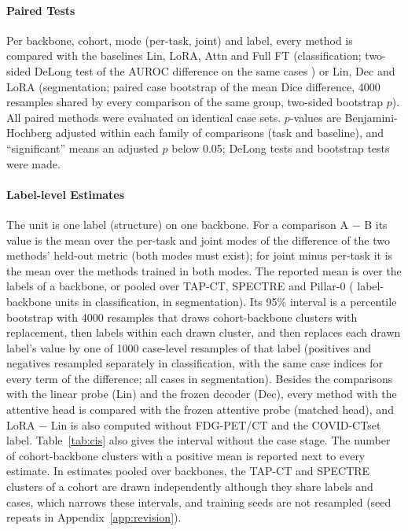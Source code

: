 \paragraph{Paired Tests} Per backbone, cohort, mode (per-task, joint) and label, every method is compared with the baselines Lin, LoRA, Attn and Full FT (classification; two-sided DeLong test of the AUROC difference on the same cases \citep{delong1988}) or Lin, Dec and LoRA (segmentation; paired case bootstrap of the mean Dice difference, 4000 resamples shared by every comparison of the same group, two-sided bootstrap $p$). All paired methods were evaluated on identical case sets. $p$-values are Benjamini-Hochberg adjusted \citep{benjamini1995fdr} within each family of comparisons (task and baseline), and ``significant'' means an adjusted $p$ below 0.05; \numDelongTestsN{} DeLong tests and \numSegpairedTestsN{} bootstrap tests were made.

\paragraph{Label-level Estimates} The unit is one label (structure) on one backbone. For a comparison A $-$ B its value is the mean over the per-task and joint modes of the difference of the two methods' held-out metric (both modes must exist); for joint minus per-task it is the mean over the methods trained in both modes. The reported mean is over the labels of a backbone, or pooled over TAP-CT, SPECTRE and Pillar-0 (\numCiClsloralinAllLabelsN{} label-backbone units in classification, \numCiSegdeclinAllLabelsN{} in segmentation). Its 95\% interval is a percentile bootstrap with 4000 resamples that draws cohort-backbone clusters with replacement, then labels within each drawn cluster, and then replaces each drawn label's value by one of 1000 case-level resamples of that label (positives and negatives resampled separately in classification, with the same case indices for every term of the difference; all cases in segmentation). Besides the comparisons with the linear probe (Lin) and the frozen decoder (Dec), every method with the attentive head is compared with the frozen attentive probe (matched head), and LoRA $-$ Lin is also computed without FDG-PET/CT and the COVID-CTset label. Table~\ref{tab:cis} also gives the interval without the case stage. The number of cohort-backbone clusters with a positive mean is reported next to every estimate. In estimates pooled over backbones, the TAP-CT and SPECTRE clusters of a cohort are drawn independently although they share labels and cases, which narrows these intervals, and training seeds are not resampled (seed repeats in Appendix~\ref{app:revision}).

